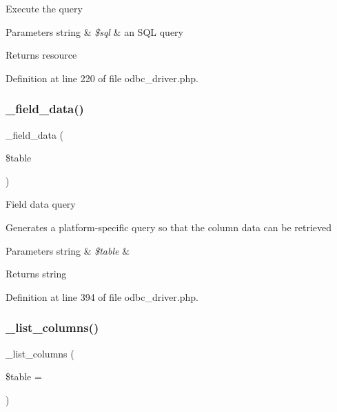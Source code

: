 Execute the query


\begin{DoxyParams}[1]{Parameters}
string & {\em \$sql} & an S\+QL query \\
\hline
\end{DoxyParams}
\begin{DoxyReturn}{Returns}
resource 
\end{DoxyReturn}


Definition at line 220 of file odbc\+\_\+driver.\+php.

\mbox{\label{class_c_i___d_b__odbc__driver_a95247d9671893adc3444cb184ad32ea1}} 
\subsubsection{\texorpdfstring{\_field\_data()}{\_field\_data()}}
{\footnotesize\ttfamily \+\_\+field\+\_\+data (\begin{DoxyParamCaption}\item[{}]{\$table }\end{DoxyParamCaption})\hspace{0.3cm}{\ttfamily [protected]}}

Field data query

Generates a platform-\/specific query so that the column data can be retrieved


\begin{DoxyParams}[1]{Parameters}
string & {\em \$table} & \\
\hline
\end{DoxyParams}
\begin{DoxyReturn}{Returns}
string 
\end{DoxyReturn}


Definition at line 394 of file odbc\+\_\+driver.\+php.

\mbox{\label{class_c_i___d_b__odbc__driver_a7ccb7f9c301fe7f0a9db701254142b63}} 
\subsubsection{\texorpdfstring{\_list\_columns()}{\_list\_columns()}}
{\footnotesize\ttfamily \+\_\+list\+\_\+columns (\begin{DoxyParamCaption}\item[{}]{\$table = {\ttfamily \textquotesingle{}\textquotesingle{}} }\end{DoxyParamCaption})\hspace{0.3cm}{\ttfamily [protected]}}

